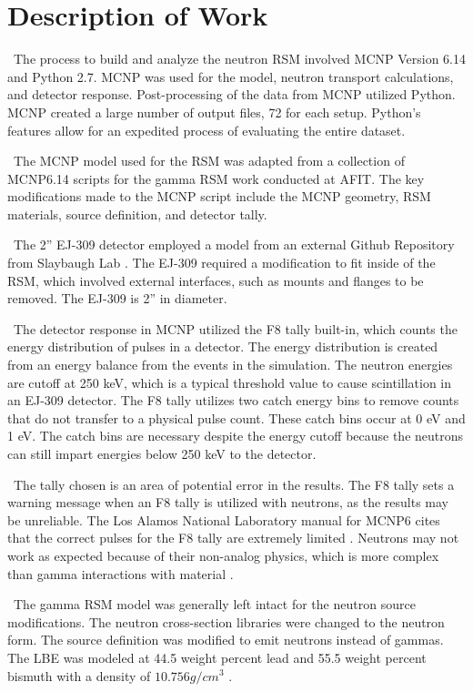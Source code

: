 \documentclass[journal]{IEEEtran}
\begin{document}
	\section{Description of Work}
	\ The process to build and analyze the neutron RSM involved MCNP Version 6.14 and Python 2.7. MCNP was used for the model, neutron transport calculations, and detector response. Post-processing of the data from MCNP utilized Python.  MCNP created a large number of output files, 72 for each setup.  Python's features allow for an expedited process of evaluating the entire dataset.   
	
	\ The MCNP model used for the RSM was adapted from a collection of MCNP6.14 scripts for the gamma RSM work conducted at AFIT\cite{RSMcode}. The key modifications made to the MCNP script include the MCNP geometry, RSM materials, source definition, and detector tally. 
	
	\ The 2'' EJ-309 detector employed a model from an external Github Repository from Slaybaugh Lab \cite{88ej309}. The EJ-309 required a modification to fit inside of the RSM, which involved external interfaces, such as mounts and flanges to be removed. The EJ-309 is 2'' in diameter. 
	
	\ The detector response in MCNP utilized the F8 tally built-in, which counts the energy distribution of pulses in a detector\cite{MCNP6}. The energy distribution is created from an energy balance from the events in the simulation. The neutron energies are cutoff at 250 keV, which is a typical threshold value to cause scintillation in an EJ-309 detector.  The F8 tally utilizes two catch energy bins to remove counts that do not transfer to a physical pulse count. These catch bins occur at 0 eV and 1 eV.  The catch bins are necessary despite the energy cutoff because the neutrons can still impart energies below 250 keV to the detector. 
	
	\ The tally chosen is an area of potential error in the results.  The F8 tally sets a warning message when an F8 tally is utilized with neutrons, as the results may be unreliable.  The Los Alamos National Laboratory manual for MCNP6 cites that the correct pulses for the F8 tally are extremely limited \cite{MCNP6}. Neutrons may not work as expected because of their non-analog physics, which is more complex than gamma interactions with material \cite{MCNP6}. 
	
	\ The gamma RSM model was generally left intact for the neutron source modifications.  The neutron cross-section libraries were changed to the neutron form.  The source definition was modified to emit neutrons instead of gammas. The LBE was modeled at 44.5 weight percent lead and 55.5 weight percent bismuth with a density of $ 10.756 g/cm^3$ \cite{LBE}. 
	
\end{document}
